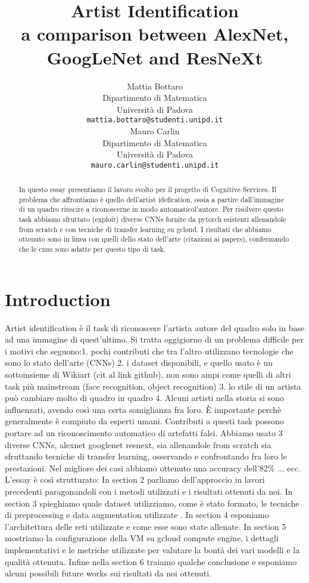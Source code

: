 \documentclass{article}
\title{Artist Identification	\\  a comparison between AlexNet, GoogLeNet and ResNeXt}
\author{
  Mattia Bottaro \\
  Dipartimento  di Matematica\\
  Università di Padova \\
  \texttt{mattia.bottaro@studenti.unipd.it} \\
   \And
  Mauro Carlin \\
Dipartimento  di Matematica\\
Università di Padova \\
\texttt{mauro.carlin@studenti.unipd.it} \\
}
\begin{document}
\maketitle

\begin{abstract}
	In questo essay presentiamo il lavoro svolto per il progetto di Cognitive Services.
	Il problema che affrontiamo è quello dell'artist idefication, ossia a partire dall'immagine di un quadro riuscire a riconoscerne  in modo automaticol'autore. Per risolvere questo task abbiamo sfruttato (exploit) diverse CNNs fornite da pytorch esistenti allenandole from scratch e con tecniche di transfer learning su gcloud. I risultati che abbiamo ottenuto sono in linea con quelli dello stato dell'arte (citazioni ai papers), confermando che le cnns sono adatte per questo tipo di task.
\end{abstract}




\section{Introduction}
Artist identification è il task di riconoscere l'artista autore del quadro solo in base ad una immagine di quest'ultimo. Si tratta oggigiorno di un problema difficile per i motivi che seguono:1. pochi contributi che tra l'altro utilizzano tecnologie che sono lo stato dell'arte (CNNs) 2. i dataset disponibili, e quello usato è un sottoinsieme di Wikiart (cit al link github), non sono ampi come quelli di altri task più mainstream (face recognition, object recognition) 3. lo stile di un artista può cambiare molto di quadro in quadro 4. Alcuni artisti nella storia si sono influenzati, avendo così una certa somiglianza fra loro. È importante perchè generalmente è compiuto da esperti umani. Contributi a questi task possono portare ad un riconoscimento automatico di artefatti falsi. 
Abbiamo usato 3 diverse CNNs, alexnet googlenet resnext, sia allenandole from scratch sia sfruttando tecniche di transfer learning, osservando e confrontando fra loro le prestazioni. Nel migliore dei casi abbiamo ottenuto una accuracy dell'82\% ... ecc.
L'essay è così strutturato: In section 2 parliamo dell'approccio in lavori precedenti paragonandoli con i metodi utilizzati e i risultati ottenuti da noi. In section 3 spieghiamo quale dataset utilizziamo, come è stato formato, le tecniche di preprocessing e data augmentation utilizzate .
In section 4  esponiamo l'architettura delle reti utilizzate e come esse sono state allenate.
In section 5 mostriamo la configurazione della  VM su gcloud compute engine, i dettagli implementativi e le metriche utilizzate per valutare la bontà dei vari modelli e la qualità ottenuta.
Infine nella section 6 traiamo qualche conclusione e esponiamo alcuni possibili future works sui risultati da noi ottenuti.
\end{document}
